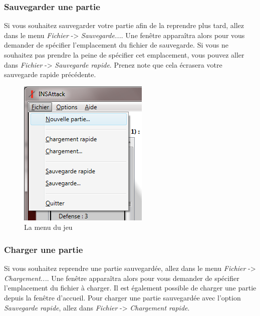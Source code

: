 \subsubsection {Sauvegarder une partie}
Si vous souhaitez sauvegarder votre partie afin de la reprendre plus tard, allez dans le menu \emph{Fichier} -> \emph{Sauvegarde...}.
Une fenêtre apparaîtra alors pour vous demander de spécifier l'emplacement du fichier de sauvegarde.
Si vous ne souhaitez pas prendre la peine de spécifier cet emplacement, vous pouvez aller dans \emph{Fichier} -> \emph{Sauvegarde rapide}.
Prenez note que cela écrasera votre sauvegarde rapide précédente.

\begin{figure}[!h]
\centering
\includegraphics{Parties/Images/Menu.png}
\caption{La menu du jeu}
\label{fig:menu}
\end{figure}

\subsubsection {Charger une partie}
Si vous souhaitez reprendre une partie sauvegardée, allez dans le menu \emph{Fichier} -> \emph{Chargement...}.
Une fenêtre apparaîtra alors pour vous demander de spécifier l'emplacement du fichier à charger.
Il est également possible de charger une partie depuis la fenêtre d'accueil.
Pour charger une partie sauvegardée avec l'option \emph{Sauvegarde rapide}, allez dans \emph{Fichier} -> \emph{Chargement rapide}.


